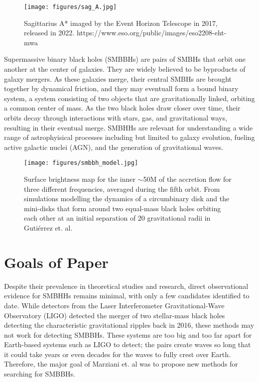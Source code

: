\documentclass[12pt]{article}
\begin{document}
\begin{figure} [ht]
  \center
  \texttt{[image: figures/sag\_A.jpg]}
  \caption{Sagittarius A* imaged by the Event Horizon Telescope in 2017, released in 2022. https://www.eso.org/public/images/eso2208-eht-mwa}
  \label{sag_A}
\end{figure}

Supermassive binary black holes (SMBBHs) are pairs of SMBHs that orbit one another at the center of galaxies. They are widely believed to be byproducts of galaxy mergers. As these galaxies merge, their central SMBHs are brought together by dynamical friction, and they may eventuall form a bound binary system, a system consisting of two objects that are gravitationally linked, orbiting a common center of mass. \supercite{ komossa2021}  As the two black holes draw closer over time, their orbits decay through interactions with stars, gas, and gravitational ways, resulting in their eventual merge. \supercite{begelman_SMBBH} SMBHHs are relevant for understanding a wide range of astrophyisical processes including but limited to 	galaxy evolution, fueling active galactic nuclei (AGN), and the generation of gravitational waves.\supercite{marziani2025}

\begin{figure} [ht]
  \center
  \texttt{[image: figures/smbbh\_model.jpg]}
  \caption{Surface brightness map for the inner $\sim$50M of the accretion flow for three different frequencies, averaged during the fifth orbit. From simulations modelling the dynamics of a circumbinary disk and the mini-disks that form around two equal-mass black holes orbiting each other at an initial separation of 20 gravitational radii in Guti\'errez et. al. \supercite{Gutierrez_2022}}
\end{figure}

\section{Goals of Paper}%

Despite their prevalence in theoretical studies and research, direct observational evidence for SMBHHs remains minimal, with only a few candidates identified to date. While detectors from the Laser Interferometer Gravitational-Wave Observatory (LIGO) detected the merger of two stellar-mass black holes detecting the characteristic gravitational ripples back in 2016, these methods may not work for detecting SMBBHs. \supercite{Abbott_2016} These systems are too big and too far apart for Earth-based systems such as LIGO to detect; the pairs create waves so long that it could take years or even decades for the waves to fully crest over Earth. Therefore, the major goal of Marziani et. al was to propose new methods for searching for SMBBHs.
\end{document}
